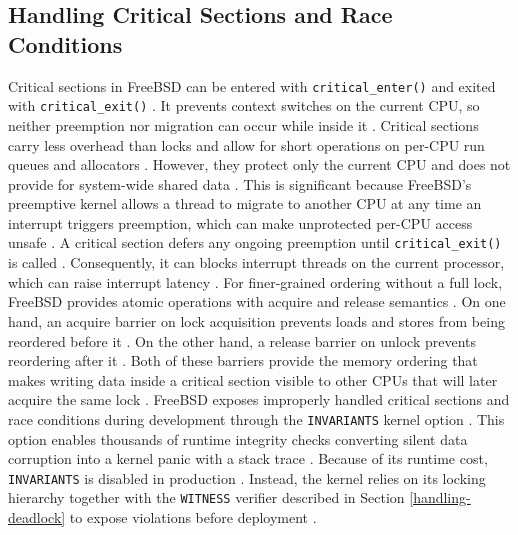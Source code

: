 \subsection{Handling Critical Sections and Race Conditions} \label{critical-sections} %

Critical sections in FreeBSD can be entered with \texttt{critical\_enter()} and exited with \texttt{critical\_exit()}
\parencite{mckusick2014_process}. It prevents context switches on the current CPU, so neither preemption nor migration can occur
while inside it \parencite{mckusick2014_process}. Critical sections carry less overhead than locks and allow for short operations on
per-CPU run queues and allocators \parencite{mckusick2014_process}. However, they protect only the current CPU and does not provide
for system-wide shared data \parencite{mckusick2014_process}. This is significant because FreeBSD's preemptive kernel allows a thread
to migrate to another CPU at any time an interrupt triggers preemption, which can make unprotected per-CPU access unsafe
\parencite{freebsd_smp_handbook}. A critical section defers any ongoing preemption until \texttt{critical\_exit()} is called
\parencite{freebsd_smp_handbook}. Consequently, it can blocks interrupt threads on the current processor, which can raise interrupt
latency \parencite{freebsd_smp_handbook}. For finer-grained ordering without a full lock, FreeBSD provides atomic operations with
acquire and release semantics \parencite{freebsd_atomic}. On one hand, an acquire barrier on lock acquisition prevents loads and
stores from being reordered before it \parencite{freebsd_atomic}. On the other hand, a release barrier on unlock prevents
reordering after it \parencite{freebsd_atomic}. Both of these barriers provide the memory ordering that makes writing data inside a
critical section visible to other CPUs that will later acquire the same lock \parencite{freebsd_atomic}.
FreeBSD exposes improperly handled critical sections and race conditions during development through the \texttt{INVARIANTS} kernel
option \parencite{freebsd_debugging}. This option enables thousands of runtime integrity checks converting silent data corruption
into a kernel panic with a stack trace \parencite{freebsd_debugging}. Because of its runtime cost, \texttt{INVARIANTS} is
disabled in production \parencite{freebsd_debugging}. Instead, the kernel relies on its locking hierarchy together with the \texttt{WITNESS}
verifier described in Section \ref{handling-deadlock} to expose violations before deployment \parencite{freebsd_debugging}.

